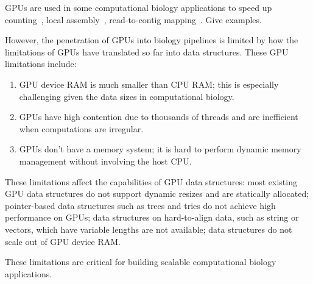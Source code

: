 GPUs are used in some computational biology applications to speed up \kmer counting~\cite{xxx}, local assembly~\cite{xxx}, read-to-contig mapping~\cite{xxx}.
Give examples.

However, the penetration of GPUs into biology pipelines is limited by how the limitations of GPUs have translated so far into data structures.  These GPU limitations include:
\begin{enumerate}
  \item GPU device RAM is much smaller than CPU RAM; this is especially
    challenging given the data sizes in computational biology.
  \item GPUs have high contention due to thousands of threads and are
    inefficient when computations are irregular.
  \item GPUs don't have a memory system; it is hard to perform dynamic memory management without involving the host CPU.
\end{enumerate}

These limitations affect the capabilities of GPU data structures: most existing GPU data structures do not support dynamic resizes and are statically allocated; pointer-based data structures such as trees and tries do not achieve high performance on GPUs; data structures on hard-to-align data, such as string or vectors, which have variable lengths are not available; data structures do not scale out of GPU device RAM.

These limitations are critical for building scalable computational biology applications. 





